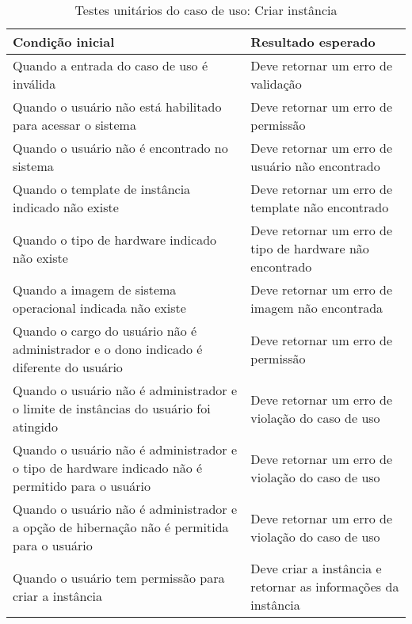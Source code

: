 \begin{table}[h]
\caption{Testes unitários do caso de uso: Criar instância}
\label{tab:testeCriarInstancia}
\begin{tabularx}{\textwidth}{p{} p{}}
\toprule
\textbf{Condição inicial} & \textbf{Resultado esperado} \\ \midrule

Quando a entrada do caso de uso é inválida & Deve retornar um erro de validação \\ \hline

Quando o usuário não está habilitado para acessar o sistema & Deve retornar um erro de permissão \\ \hline

Quando o usuário não é encontrado no sistema & Deve retornar um erro de usuário não encontrado \\ \hline

Quando o template de instância indicado não existe & Deve retornar um erro de template não encontrado \\ \hline

Quando o tipo de hardware indicado não existe & Deve retornar um erro de tipo de hardware não encontrado \\ \hline

Quando a imagem de sistema operacional indicada não existe & Deve retornar um erro de imagem não encontrada \\ \hline

Quando o cargo do usuário não é administrador e o dono indicado é diferente do usuário & Deve retornar um erro de permissão \\ \hline

Quando o usuário não é administrador e o limite de instâncias do usuário foi atingido & Deve retornar um erro de violação do caso de uso \\ \hline

Quando o usuário não é administrador e o tipo de hardware indicado não é permitido para o usuário & Deve retornar um erro de violação do caso de uso \\ \hline

Quando o usuário não é administrador e a opção de hibernação não é permitida para o usuário & Deve retornar um erro de violação do caso de uso \\ \hline

Quando o usuário tem permissão para criar a instância & Deve criar a instância e retornar as informações da instância \\

\bottomrule
\end{tabularx}
\end{table}


